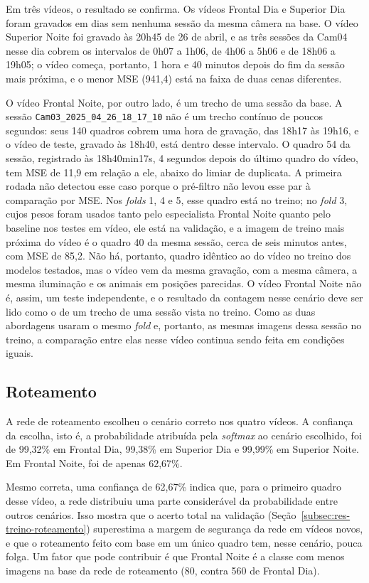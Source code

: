 Em três vídeos, o resultado se confirma. Os vídeos Frontal Dia e Superior Dia foram gravados em dias sem nenhuma sessão da mesma câmera na base. O vídeo Superior Noite foi gravado às 20h45 de 26 de abril, e as três sessões da Cam04 nesse dia cobrem os intervalos de 0h07 a 1h06, de 4h06 a 5h06 e de 18h06 a 19h05; o vídeo começa, portanto, 1 hora e 40 minutos depois do fim da sessão mais próxima, e o menor MSE (941,4) está na faixa de duas cenas diferentes.

O vídeo Frontal Noite, por outro lado, é um trecho de uma sessão da base. A sessão \texttt{Cam03\_2025\_04\_26\_18\_17\_10} não é um trecho contínuo de poucos segundos: seus 140 quadros cobrem uma hora de gravação, das 18h17 às 19h16, e o vídeo de teste, gravado às 18h40, está dentro desse intervalo. O quadro 54 da sessão, registrado às 18h40min17s, 4 segundos depois do último quadro do vídeo, tem MSE de 11,9 em relação a ele, abaixo do limiar de duplicata. A primeira rodada não detectou esse caso porque o pré-filtro não levou esse par à comparação por MSE. Nos \textit{folds} 1, 4 e 5, esse quadro está no treino; no \textit{fold} 3, cujos pesos foram usados tanto pelo especialista Frontal Noite quanto pelo baseline nos testes em vídeo, ele está na validação, e a imagem de treino mais próxima do vídeo é o quadro 40 da mesma sessão, cerca de seis minutos antes, com MSE de 85,2. Não há, portanto, quadro idêntico ao do vídeo no treino dos modelos testados, mas o vídeo vem da mesma gravação, com a mesma câmera, a mesma iluminação e os animais em posições parecidas. O vídeo Frontal Noite não é, assim, um teste independente, e o resultado da contagem nesse cenário deve ser lido como o de um trecho de uma sessão vista no treino. Como as duas abordagens usaram o mesmo \textit{fold} e, portanto, as mesmas imagens dessa sessão no treino, a comparação entre elas nesse vídeo continua sendo feita em condições iguais.

\subsection{Roteamento}
\label{subsec:res-roteamento-videos}

A rede de roteamento escolheu o cenário correto nos quatro vídeos. A confiança da escolha, isto é, a probabilidade atribuída pela \textit{softmax} ao cenário escolhido, foi de 99,32\% em Frontal Dia, 99,38\% em Superior Dia e 99,99\% em Superior Noite. Em Frontal Noite, foi de apenas 62,67\%.

Mesmo correta, uma confiança de 62,67\% indica que, para o primeiro quadro desse vídeo, a rede distribuiu uma parte considerável da probabilidade entre outros cenários. Isso mostra que o acerto total na validação (Seção~\ref{subsec:res-treino-roteamento}) superestima a margem de segurança da rede em vídeos novos, e que o roteamento feito com base em um único quadro tem, nesse cenário, pouca folga. Um fator que pode contribuir é que Frontal Noite é a classe com menos imagens na base da rede de roteamento (80, contra 560 de Frontal Dia).

